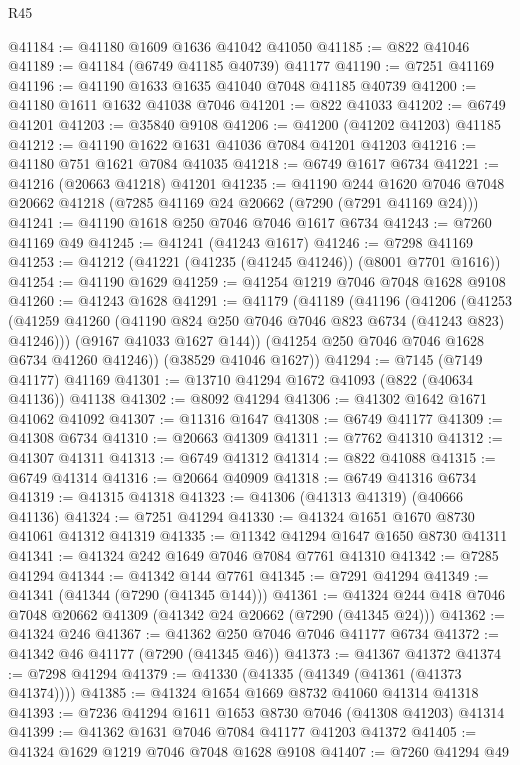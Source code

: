 \begin{lexlean}{R45}
\begin{coremodule}
{@41184 := @41180 @1609 @1636 @41042 @41050
@41185 := @822 @41046
@41189 := @41184 (@6749 @41185 @40739) @41177
@41190 := @7251 @41169
@41196 := @41190 @1633 @1635 @41040 @7048 @41185 @40739
@41200 := @41180 @1611 @1632 @41038 @7046
@41201 := @822 @41033
@41202 := @6749 @41201
@41203 := @35840 @9108
@41206 := @41200 (@41202 @41203) @41185
@41212 := @41190 @1622 @1631 @41036 @7084 @41201 @41203
@41216 := @41180 @751 @1621 @7084 @41035
@41218 := @6749 @1617 @6734
@41221 := @41216 (@20663 @41218) @41201
@41235 := @41190
    @244
    @1620
    @7046
    @7048
    @20662
    @41218
    (@7285 @41169 @24 @20662 (@7290 (@7291 @41169 @24)))
@41241 := @41190 @1618 @250 @7046 @7046 @1617 @6734
@41243 := @7260 @41169 @49
@41245 := @41241 (@41243 @1617)
@41246 := @7298 @41169
@41253 := @41212 (@41221 (@41235 (@41245 @41246)) (@8001 @7701 @1616))
@41254 := @41190 @1629
@41259 := @41254 @1219 @7046 @7048 @1628 @9108
@41260 := @41243 @1628
@41291 := @41179
    (@41189
      (@41196
        (@41206
          (@41253 (@41259 @41260 (@41190 @824 @250 @7046 @7046 @823 @6734 (@41243 @823) @41246)))
          (@9167 @41033 @1627 @144))
        (@41254 @250 @7046 @7046 @1628 @6734 @41260 @41246))
      (@38529 @41046 @1627))
@41294 := @7145 (@7149 @41177) @41169
@41301 := @13710 @41294 @1672 @41093 (@822 (@40634 @41136)) @41138
@41302 := @8092 @41294
@41306 := @41302 @1642 @1671 @41062 @41092
@41307 := @11316 @1647
@41308 := @6749 @41177
@41309 := @41308 @6734
@41310 := @20663 @41309
@41311 := @7762 @41310
@41312 := @41307 @41311
@41313 := @6749 @41312
@41314 := @822 @41088
@41315 := @6749 @41314
@41316 := @20664 @40909
@41318 := @6749 @41316 @6734
@41319 := @41315 @41318
@41323 := @41306 (@41313 @41319) (@40666 @41136)
@41324 := @7251 @41294
@41330 := @41324 @1651 @1670 @8730 @41061 @41312 @41319
@41335 := @11342 @41294 @1647 @1650 @8730 @41311
@41341 := @41324 @242 @1649 @7046 @7084 @7761 @41310
@41342 := @7285 @41294
@41344 := @41342 @144 @7761
@41345 := @7291 @41294
@41349 := @41341 (@41344 (@7290 (@41345 @144)))
@41361 := @41324 @244 @418 @7046 @7048 @20662 @41309 (@41342 @24 @20662 (@7290 (@41345 @24)))
@41362 := @41324 @246
@41367 := @41362 @250 @7046 @7046 @41177 @6734
@41372 := @41342 @46 @41177 (@7290 (@41345 @46))
@41373 := @41367 @41372
@41374 := @7298 @41294
@41379 := @41330 (@41335 (@41349 (@41361 (@41373 @41374))))
@41385 := @41324 @1654 @1669 @8732 @41060 @41314 @41318
@41393 := @7236 @41294 @1611 @1653 @8730 @7046 (@41308 @41203) @41314
@41399 := @41362 @1631 @7046 @7084 @41177 @41203 @41372
@41405 := @41324 @1629 @1219 @7046 @7048 @1628 @9108
@41407 := @7260 @41294 @49
}
\end{coremodule}
\end{lexlean}
